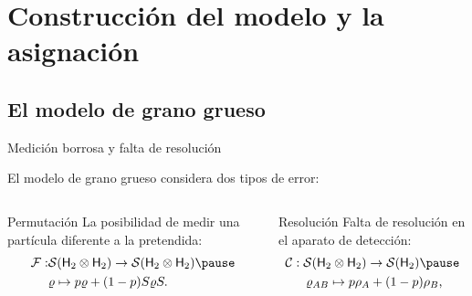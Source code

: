 \section{Construcción del modelo y la asignación}

\subsection{El modelo de grano grueso}
\begin{frame}{Medición borrosa y falta de resolución}
    \begin{center}
        El modelo de grano grueso considera dos tipos de error\pause:
    \end{center}
    \vspace{0.3cm}
    \begin{columns}
        \begin{column}{0.5\textwidth}
            \begin{block}{Permutación}
            \centering
            La posibilidad de medir una partícula diferente a la pretendida\pause:
            \begin{align}
                \mcF:&\mcS(\hilbert_2 \otimes \hilbert_2)\to \mcS(\hilbert_2 \otimes \hilbert_2)\pause\nonumber\\
                &\varrho \mapsto p\varrho+(1-p)S\varrho S.\nonumber
            \end{align}
        \end{block}
        \end{column}
        \pause
        \begin{column}{0.5\textwidth}
            \begin{block}{Resolución}
            \centering
            Falta de resolución en el aparato de detección\pause:
            \begin{gather}
                \mcC:\mcS(\hilbert_2 \otimes \hilbert_2)\to \mcS(\hilbert_2)\pause\nonumber\\
                \varrho_{AB} \mapsto p\rho_A+(1-p)\rho_B\rlap{,}\nonumber
            \end{gather}
        \end{block}
        \end{column}
    \end{columns}
\end{frame}
